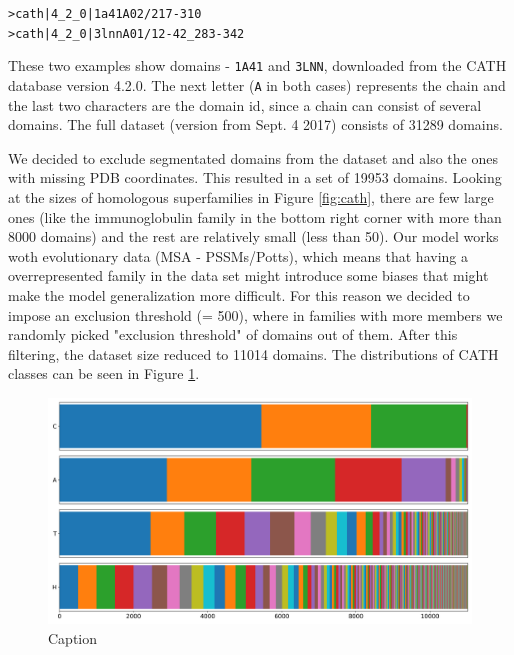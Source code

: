 \begin{center}
    \texttt{>cath|4\_2\_0|1a41A02/217-310}\\
    \texttt{>cath|4\_2\_0|3lnnA01/12-42\_283-342}
\end{center}
    
These two examples show domains - \texttt{1A41} and \texttt{3LNN}, downloaded from the CATH database version 4.2.0. 
The next letter (\texttt{A} in both cases) represents the chain and the last two characters are the domain id, since a chain can consist of several domains. 
The full dataset (version from Sept. 4 2017) consists of 31289 domains. 
    
We decided to exclude segmentated domains from the dataset and also the ones with missing PDB coordinates. 
This resulted in a set of 19953 domains. 
Looking at the sizes of homologous superfamilies in Figure \ref{fig:cath}, there are few large ones (like the immunoglobulin family in the bottom right corner with more than 8000 domains) and the rest are relatively small (less than 50). 
Our model works woth evolutionary data (MSA - PSSMs/Potts), which means that having a overrepresented family in the data set might introduce some biases that might make the model generalization more difficult. 
For this reason we decided to impose an exclusion threshold (= 500), where in families with more members we randomly picked "exclusion threshold" of domains out of them. 
After this filtering, the dataset size reduced to 11014 domains.
The distributions of CATH classes can be seen in Figure \ref{fig:cath_filtered}.
    
\begin{figure}
    \centering
    \includegraphics[scale=0.4]{imgs_tomas/cath_distributions_filtered.png}
    \caption{Caption}
    \label{fig:cath_filtered}
\end{figure}

